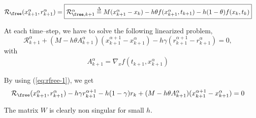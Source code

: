 \[  \mathcal R
_{\free}(x^{\alpha}_{k+1},r^{\alpha}_{k+1} )=\fbox{$ \mathcal R _{\free, k+1} ^{\alpha} \stackrel{\Delta}{=}  M(x^{\alpha}_{k+1} - x_{k}) -h\theta f( x^{\alpha}_{k+1} , t_{k+1}) - h(1-\theta)f(x_k,t_k)$}\]
 
At each time--step, we have to solve the following linearized problem,
\begin{equation}
   \label{eq:NL10}
    \mathcal R^{\alpha}_{k+1} + (M-h\theta A ^{\alpha}_{k+1}) (x^{\alpha+1}_{k+1} -
    x^{\alpha}_{k+1}) - h \gamma (r^{\alpha+1}_{k+1} - r^{\alpha}_{k+1} )  =0 ,
\end{equation}
with 
\begin{equation}
     \begin{array}{l}
       A^{\alpha}_{k+1} = \nabla_x f(t_{k+1}, x^{\alpha}_{k+1}) 
 \end{array}
\end{equation}

By using (\ref{eq:rfree-1}), we get
\begin{equation}
  \label{eq:rfree-2}
  \mathcal R
_{\free}(x^{\alpha}_{k+1},r^{\alpha}_{k+1} )  - h\gamma r^{\alpha+1}_{k+1} - h(1-\gamma)r_k  + (M-h\theta A^{\alpha}_{k+1}) (x^{\alpha+1}_{k+1} -
    x^{\alpha}_{k+1})  =0 
\end{equation}


The matrix $W$ is clearly non singular for small $h$.




